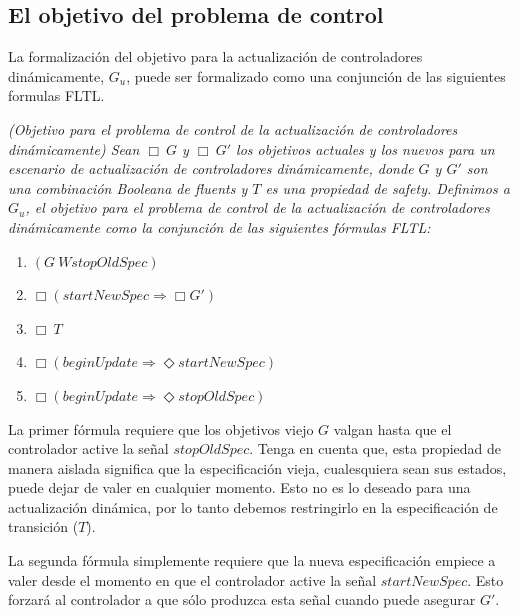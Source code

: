 \subsection{El objetivo del problema de control}

La formalización del objetivo para la actualización de controladores dinámicamente, $G_u$, puede ser formalizado
como una conjunción de las siguientes formulas FLTL.

\begin{nahaDef}
\label{update_goals_def}
\emph{(Objetivo para el problema de control de la actualización de controladores dinámicamente) Sean $\Box\ G$ y $\Box\ G'$
los objetivos actuales y los nuevos para un escenario de actualización de controladores dinámicamente, donde $G$ y $G'$
son una combinación Booleana de fluents y $T$ es una propiedad de safety. Definimos a $G_u$, el objetivo para el
problema de control de la actualización de controladores dinámicamente como la conjunción de las siguientes fórmulas
FLTL:}

\begin{enumerate}
\itemsep-4mm
\item $(G\ W stopOldSpec)$
\item $\Box(startNewSpec \Longrightarrow \Box G')$
\item $\Box\ T$
\item $\Box(beginUpdate \Longrightarrow \Diamond startNewSpec)$
\item $\Box(beginUpdate \Longrightarrow \Diamond stopOldSpec)$
\end{enumerate}
\end{nahaDef}

La primer fórmula requiere que los objetivos viejo $G$ valgan hasta que el controlador active la señal $stopOldSpec$.
Tenga en cuenta que, esta propiedad de manera aislada significa que la especificación vieja, cualesquiera sean sus estados,
puede dejar de valer en cualquier momento. Esto no es lo deseado para una actualización dinámica, por lo tanto debemos
restringirlo en la especificación de transición ($T$).

La segunda fórmula simplemente requiere que la nueva especificación empiece a valer desde el momento en que el
controlador active la señal $startNewSpec$. Esto forzará al controlador a que sólo produzca esta señal cuando puede
asegurar $G'$.

